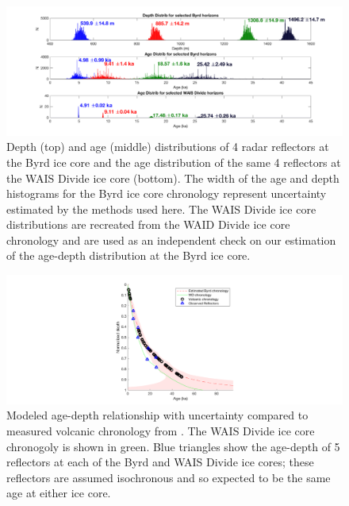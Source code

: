 \begin{figure}[h]
\centering
\includegraphics[scale=0.3]{../analysis/figures/agedepthhisto}
\caption[]{Depth (top) and age (middle) distributions of 4 radar reflectors at the Byrd ice core and the age distribution of the same 4 reflectors at the WAIS Divide ice core (bottom). The width of the age and depth histograms for the Byrd ice core chronology represent uncertainty estimated by the methods used here. The WAIS Divide ice core distributions are recreated from the WAID Divide ice core chronology \cite{buizert2013} and are used as an independent check on our estimation of the age-depth distribution at the Byrd ice core.}
\label{fig:layer_histo}
\end{figure}

\begin{figure}[h]
\centering
\includegraphics[scale=0.3]{../analysis/figures/spaghetti}
\caption[]{Modeled age-depth relationship with uncertainty compared to measured volcanic chronology from \citet[open circles;][]{hammer97}. The WAIS Divide ice core chronogoly \citep{buizert2013} is shown in green. Blue triangles show the age-depth of 5 reflectors at each of the Byrd and WAIS Divide ice cores; these reflectors are assumed isochronous and so expected to be the same age at either ice core.}
\label{fig:spaghetti}
\end{figure}